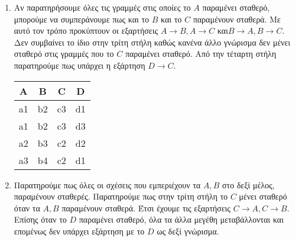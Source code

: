 \documentclass{assignment}
\begin{document}
\begin{enumerate}

\item
Αν παρατηρήσουμε όλες τις γραμμές στις οποίες το $A$ παραμένει σταθερό, μπορούμε να συμπεράνουμε πως και το $B$ και το $C$ παραμένουν σταθερά. 
Mε αυτό τον τρόπο προκύπτουν οι εξαρτήσεις $A \rightarrow B, A \rightarrow C$ και$B \rightarrow A, B \rightarrow C$.
Δεν συμβαίνει το ίδιο στην τρίτη στήλη καθώς κανένα άλλο γνώρισμα δεν μένει σταθερό στις γραμμές που το $C$ παραμένει σταθερό. 
Από την τέταρτη στήλη παρατηρούμε πως υπάρχει η εξάρτηση $D \rightarrow C$. 

\begin{center}
\begin{tabular}{|c|c|c|c|}
    \hline
    A & B & C & D \\ \hline
    a1 & b2 & c3 & d1 \\ \hline
    a1 & b2 & c3 & d3 \\ \hline
    a2 & b3 & c2 & d2 \\ \hline
    a3 & b4 & c2 & d1 \\ \hline
\end{tabular}
\end{center}

\item 
Παρατηρούμε πως όλες οι σχέσεις που εμπεριέχουν τα $A,B$ στο δεξί μέλος, παραμένουν σταθερές. Παρατηρούμε πως στην τρίτη στήλη το $C$ μένει σταθερό όταν τα $A,B$ παραμένουν σταθερά. 
Έτσι έχουμε τις εξαρτήσεις $C \rightarrow A, C \rightarrow B$. 
Επίσης όταν το $D$ παραμένει σταθερό, όλα τα άλλα μεγέθη μεταβάλλονται και επομένως δεν υπάρχει εξάρτηση με το $D$ ως δεξί γνώρισμα.

\end{enumerate}

\newpage
\end{document}
